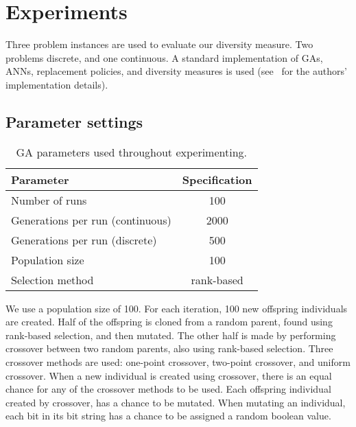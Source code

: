 \section{Experiments}
Three problem instances are used to evaluate our diversity measure. Two problems discrete, and one continuous. A standard implementation of GAs, ANNs, replacement policies, and diversity measures is used (see~\cite{mbm:kmc:ekoGA} for the authors' implementation details). 

\subsection{Parameter settings}

\begin{table}
  \centering
  \begin{tabular}{l S}
    \toprule
    Parameter & {Specification} \\
    \midrule
    Number of runs & 100 \\
    Generations per run (continuous) & 2000 \\
    Generations per run (discrete) & 500 \\
    Population size & 100 \\
    Selection method & {rank-based} \\
    \bottomrule
  \end{tabular}
  \caption{GA parameters used throughout experimenting.}
  \label{tab:gaparam}
\end{table}

We use a population size of 100. For each iteration, 100 new offspring individuals are created. Half of the offspring is cloned from a random parent, found using rank-based selection, and then mutated. The other half is made by performing crossover between two random parents, also using rank-based selection.
Three crossover methods are used: one-point crossover, two-point crossover, and uniform crossover. When a new individual is created using crossover, there is an equal chance for any of the crossover methods to be used. 
Each offspring individual created by crossover, has a  chance to be mutated.
When mutating an individual, each bit in its bit string has a  chance to be assigned a random boolean value.




